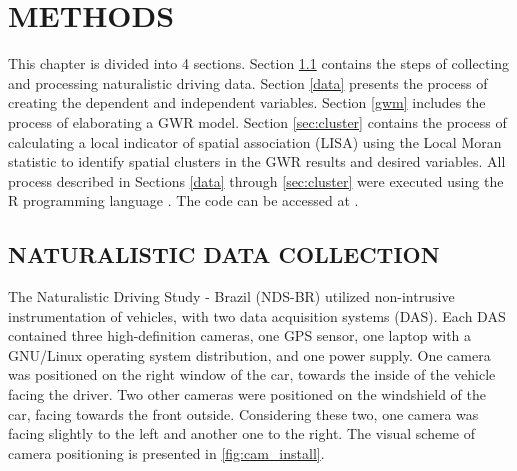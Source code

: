 
\chapter{METHODS} \label{cap:methods}

This chapter is divided into 4 sections. Section \ref{ndsc} contains the steps of collecting and processing naturalistic driving data. Section \ref{data} presents the process of creating the dependent and independent variables. Section \ref{gwm} includes the process of elaborating a GWR model. Section \ref{sec:cluster} contains the process of calculating a local indicator of spatial association (LISA) using the Local Moran statistic to identify spatial clusters in the GWR results and desired variables. All process described in Sections \ref{data} through \ref{sec:cluster} were executed using the R programming language \cite{rcoreteam2021}. The code can be accessed at \textcite{santos2022}.  
 
\section{NATURALISTIC DATA COLLECTION} \label{ndsc}




The Naturalistic Driving Study - Brazil (NDS-BR) utilized non-intrusive instrumentation of vehicles, with two data acquisition systems (DAS). Each DAS contained three high-definition cameras, one GPS sensor, one laptop with a GNU/Linux operating system distribution, and one power supply. One camera was positioned on the right window of the car, towards the inside of the vehicle facing the driver. Two other cameras were positioned on the windshield of the car, facing towards the front outside. Considering these two, one camera was facing slightly to the left and another one to the right. The visual scheme of camera positioning is presented in \autoref{fig:cam_install}.

